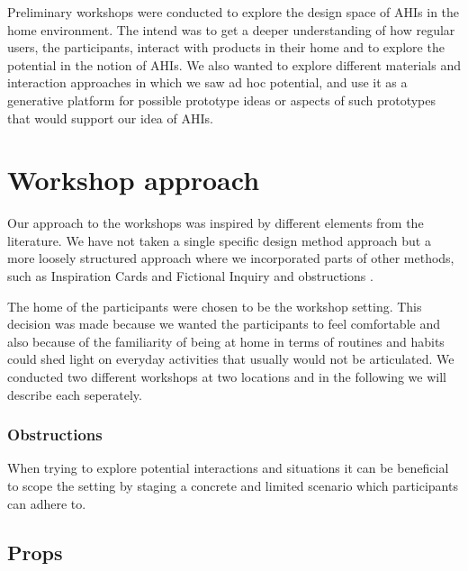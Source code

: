 

Preliminary workshops were conducted to explore the design space of AHIs in the home environment.
The intend was to get a deeper understanding of how regular users, the participants, interact with products in their home and to explore the potential in the notion of AHIs.
We also wanted to explore different materials and interaction approaches in which we saw ad hoc potential, and use it as a generative platform for possible prototype ideas or aspects of such prototypes that would support our idea of AHIs.

\section{Workshop approach}
\label{ch:workshops:approach}
Our approach to the workshops was inspired by different elements from the literature.
We have not taken a single specific design method approach but a more loosely structured approach where we incorporated parts of other methods, such as Inspiration Cards \citep{halskov2006inspiration} and Fictional Inquiry and obstructions \citep{dindler2007fictional}.

The home of the participants were chosen to be the workshop setting.
This decision was made because we wanted the participants to feel comfortable and also because of the familiarity of being at home in terms of routines and habits could shed light on everyday activities that usually would not be articulated.
We conducted two different workshops at two locations and in the following we will describe each seperately.

\subsubsection{Obstructions}
\label{ch:workshops:approach:obstructions}

When trying to explore potential interactions and situations it can be beneficial to scope the setting by staging a concrete and limited scenario which participants can adhere to.







\subsection{Props}
\label{ch:workshops:approach:props}

